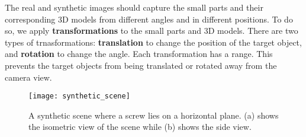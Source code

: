 The real and synthetic images should capture the small parts and their corresponding 3D models from different angles and in different positions. To do so, we apply \textbf{transformations} to the small parts and 3D models. There are two types of trnasformations: \textbf{translation} to change the position of the target object, and \textbf{rotation} to change the angle. Each transformation has a range. This prevents the target objects from being translated or rotated away from the camera view.

\begin{figure}[h]
\centering
  \texttt{[image: synthetic\_scene]}
\caption{A synthetic scene where a screw lies on a horizontal plane. (a) shows the isometric view of the scene while (b) shows the side view.}
\label{fig:synthetic_scene}
\end{figure}
